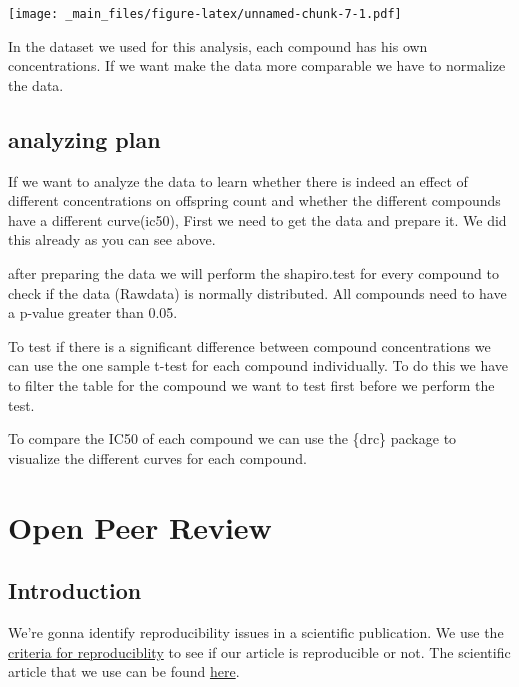 \documentclass[
]{book}
\begin{document}
\texttt{[image: \_main\_files/figure-latex/unnamed-chunk-7-1.pdf]}

In the dataset we used for this analysis, each compound has his own concentrations. If we want make the data more comparable we have to normalize the data.

\hypertarget{analyzing-plan}{%
\section{analyzing plan}\label{analyzing-plan}}

If we want to analyze the data to learn whether there is indeed an effect of different concentrations on offspring count and whether the different compounds have a different curve(ic50), First we need to get the data and prepare it. We did this already as you can see above.

after preparing the data we will perform the shapiro.test for every compound to check if the data (Rawdata) is normally distributed. All compounds need to have a p-value greater than 0.05.

To test if there is a significant difference between compound concentrations we can use the one sample t-test for each compound individually. To do this we have to filter the table for the compound we want to test first before we perform the test.

To compare the IC50 of each compound we can use the
\{drc\} package to visualize the different curves for each compound.

\hypertarget{open-peer-review}{%
\chapter{Open Peer Review}\label{open-peer-review}}

\hypertarget{introduction-2}{%
\section{Introduction}\label{introduction-2}}

We're gonna identify reproducibility issues in a scientific publication. We use the \href{https://www.researchgate.net/publication/340244621_Reproducibility_and_reporting_practices_in_COVID-19_preprint_manuscripts}{criteria for reproduciblity} to see if our article is reproducible or not. The scientific article that we use can be found \href{https://www.ncbi.nlm.nih.gov/pmc/articles/PMC4173157/}{here}.
\end{document}
